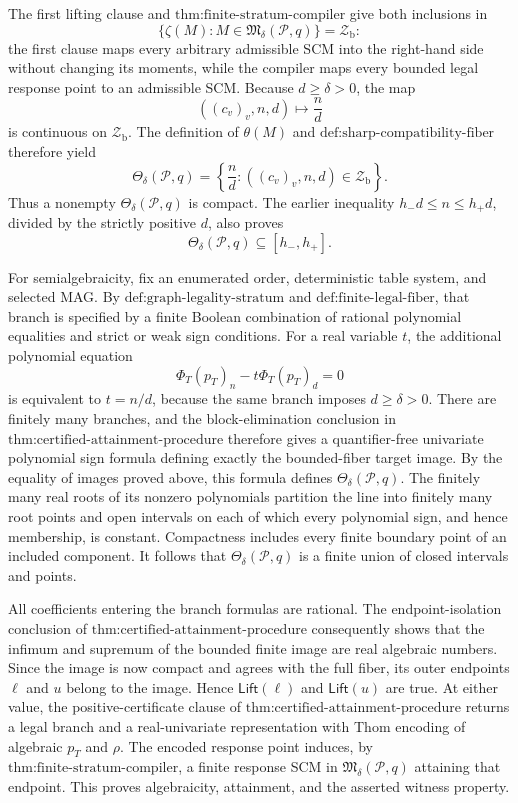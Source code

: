 The first lifting clause and \(\text{thm:finite-stratum-compiler}\) give both inclusions in
\[
 \{\zeta(M):M\in\mathfrak M_\delta(\mathcal P,q)\}
 =\mathcal Z_{\mathrm b}:
\]
the first clause maps every arbitrary admissible SCM into the right-hand side without changing its moments, while the compiler maps every bounded legal response point to an admissible SCM.  Because \(d\ge\delta>0\), the map
\[
 ((c_v)_v,n,d)\longmapsto \frac nd
\]
is continuous on \(\mathcal Z_{\mathrm b}\).  The definition of \(\theta(M)\) and \(\text{def:sharp-compatibility-fiber}\) therefore yield
\[
 \Theta_\delta(\mathcal P,q)
 =\left\{\frac nd:((c_v)_v,n,d)\in\mathcal Z_{\mathrm b}\right\}.
\]
Thus a nonempty \(\Theta_\delta(\mathcal P,q)\) is compact.  The earlier inequality \(h_-d\le n\le h_+d\), divided by the strictly positive \(d\), also proves
\[
 \Theta_\delta(\mathcal P,q)\subseteq[h_-,h_+].
\]

For semialgebraicity, fix an enumerated order, deterministic table system, and selected MAG.  By \(\text{def:graph-legality-stratum}\) and \(\text{def:finite-legal-fiber}\), that branch is specified by a finite Boolean combination of rational polynomial equalities and strict or weak sign conditions.  For a real variable \(t\), the additional polynomial equation
\[
 \Phi_T(p_T)_n-t\Phi_T(p_T)_d=0
\]
is equivalent to \(t=n/d\), because the same branch imposes \(d\ge\delta>0\).  There are finitely many branches, and the block-elimination conclusion in \(\text{thm:certified-attainment-procedure}\) therefore gives a quantifier-free univariate polynomial sign formula defining exactly the bounded-fiber target image.  By the equality of images proved above, this formula defines \(\Theta_\delta(\mathcal P,q)\).  The finitely many real roots of its nonzero polynomials partition the line into finitely many root points and open intervals on each of which every polynomial sign, and hence membership, is constant.  Compactness includes every finite boundary point of an included component.  It follows that \(\Theta_\delta(\mathcal P,q)\) is a finite union of closed intervals and points.

All coefficients entering the branch formulas are rational.  The endpoint-isolation conclusion of \(\text{thm:certified-attainment-procedure}\) consequently shows that the infimum and supremum of the bounded finite image are real algebraic numbers.  Since the image is now compact and agrees with the full fiber, its outer endpoints \(\ell\) and \(u\) belong to the image.  Hence \(\mathsf{Lift}(\ell)\) and \(\mathsf{Lift}(u)\) are true.  At either value, the positive-certificate clause of \(\text{thm:certified-attainment-procedure}\) returns a legal branch and a real-univariate representation with Thom encoding of algebraic \(p_T\) and \(\rho\).  The encoded response point induces, by \(\text{thm:finite-stratum-compiler}\), a finite response SCM in \(\mathfrak M_\delta(\mathcal P,q)\) attaining that endpoint.  This proves algebraicity, attainment, and the asserted witness property.

